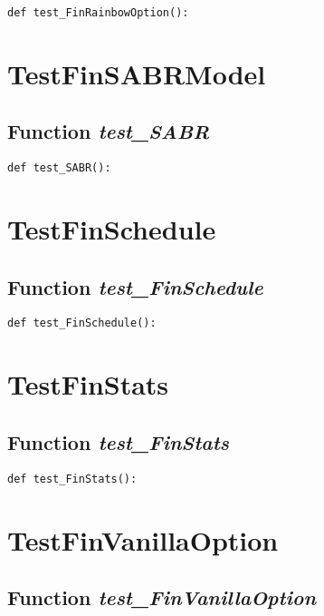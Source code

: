 \documentclass[twoside,11pt]{book}
\begin{document}
\begin{lstlisting}
def test_FinRainbowOption():
\end{lstlisting}


\newpage
\section{TestFinSABRModel}

\subsection{Function {\it test\_SABR}}


\begin{lstlisting}
def test_SABR():
\end{lstlisting}


\newpage
\section{TestFinSchedule}

\subsection{Function {\it test\_FinSchedule}}


\begin{lstlisting}
def test_FinSchedule():
\end{lstlisting}


\newpage
\section{TestFinStats}

\subsection{Function {\it test\_FinStats}}


\begin{lstlisting}
def test_FinStats():
\end{lstlisting}


\newpage
\section{TestFinVanillaOption}

\subsection{Function {\it test\_FinVanillaOption}}
\end{document}
